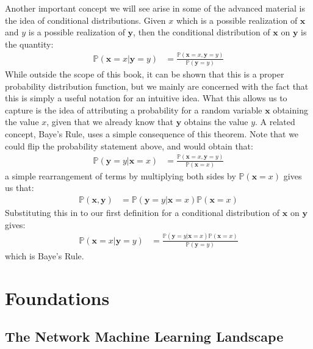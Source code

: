 \documentclass[letterpaper,10pt,english]{jupyterBook}
\begin{document}
\sphinxAtStartPar
Another important concept we will see arise in some of the advanced material is the idea of conditional distributions. Given \(x\) which is a possible realization of \(\mathbf x\) and \(y\) is a possible realization of \(\mathbf y\), then the conditional distribution of \(\mathbf x\) on \(\mathbf y\) is the quantity:
\begin{align*}
\mathbb P(\mathbf x = x | \mathbf y = y) &= \frac{\mathbb P(\mathbf x = x, \mathbf y = y)}{\mathbb P(\mathbf y = y)}
\end{align*}
\sphinxAtStartPar
While outside the scope of this book, it can be shown that this is a proper probability distribution function, but we mainly are concerned with the fact that this is simply a useful notation for an intuitive idea. What this allows us to capture is the idea of attributing a probability for a random variable \(\mathbf x\) obtaining the value \(x\), given that we already know that \(\mathbf y\) obtains the value \(y\). A related concept, Baye’s Rule, uses a simple consequence of this theorem. Note that we could flip the probability statement above, and would obtain that:
\begin{align*}
\mathbb P(\mathbf y = y | \mathbf x = x) &= \frac{\mathbb P(\mathbf x = x, \mathbf y = y)}{\mathbb P(\mathbf x = x)}
\end{align*}
\sphinxAtStartPar
a simple rearrangement of terms by multiplying both sides by \(\mathbb P(\mathbf x = x)\) gives us that:
\begin{align*}
\mathbb P(\mathbf x, \mathbf y)&= 
\mathbb P(\mathbf y = y | \mathbf x = x)\mathbb P(\mathbf x = x)
\end{align*}
\sphinxAtStartPar
Substituting this in to our first definition for a conditional distribution of \(\mathbf x\) on \(\mathbf y\) gives:
\begin{align*}
\mathbb P(\mathbf x = x | \mathbf y = y) &= \frac{\mathbb P(\mathbf y = y | \mathbf x = x)\mathbb P(\mathbf x = x)}{\mathbb P(\mathbf y = y)}
\end{align*}
\sphinxAtStartPar
which is Baye’s Rule.


\part{Foundations}


\chapter{The Network Machine Learning Landscape}
\label{\detokenize{foundations/ch1/ch1:the-network-machine-learning-landscape}}\label{\detokenize{foundations/ch1/ch1::doc}}
\end{document}
